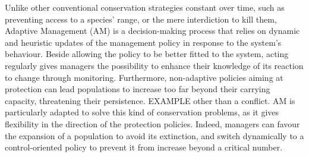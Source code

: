 \documentclass[12pt,a4paper]{article}
\begin{document}
Unlike other conventional conservation strategies constant over time, such as preventing access to a species' range, or the mere interdiction to kill them,
Adaptive Management (AM) is a decision-making process that relies on dynamic and heuristic updates of the management policy in response to the system's behaviour.
Beside allowing the policy to be better fitted to the system, acting regularly gives managers the possibility to enhance their knowledge of its reaction to change through monitoring. %
%
%
%
Furthermore, non-adaptive policies aiming at protection can lead populations to increase too far beyond their carrying capacity, threatening their persistence.
EXAMPLE other than a conflict.
AM is particularly adapted to solve this kind of conservation problems, as it gives flexibility in the direction of the protection policies.
Indeed, managers can favour the expansion of a population to avoid its extinction, and switch dynamically to a control-oriented policy to prevent it from increase beyond a critical number. 
\end{document}
